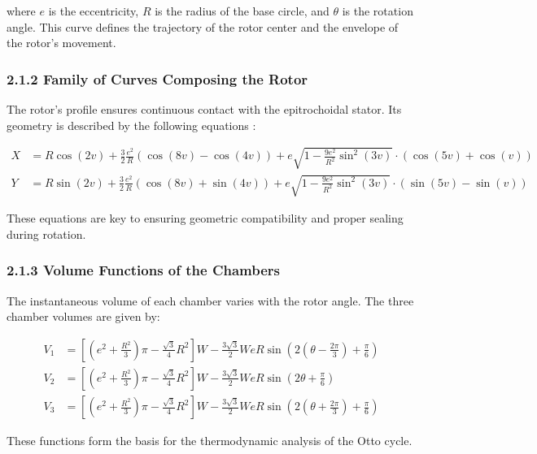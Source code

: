 \documentclass[man,floatsintext,noextraspace]{apa6}
\begin{document}
where \( e \) is the eccentricity, \( R \) is the radius of the base circle, and \( \theta \) is the rotation angle. This curve defines the trajectory of the rotor center and the envelope of the rotor's movement.

\subsubsection{2.1.2 Family of Curves Composing the Rotor}

The rotor’s profile ensures continuous contact with the epitrochoidal stator. Its geometry is described by the following equations \cite{yamamoto1981}:

\begin{align}
X &= R \cos(2v) + \frac{3}{2} \frac{e^2}{R} (\cos(8v) - \cos(4v)) 
+ e \sqrt{1 - \frac{9e^2}{R^2} \sin^2(3v)} \cdot (\cos(5v) + \cos(v)) \\
Y &= R \sin(2v) + \frac{3}{2} \frac{e^2}{R} (\cos(8v) + \sin(4v)) 
+ e \sqrt{1 - \frac{9e^2}{R^2} \sin^2(3v)} \cdot (\sin(5v) - \sin(v))
\end{align}

These equations are key to ensuring geometric compatibility and proper sealing during rotation.

\subsubsection{2.1.3 Volume Functions of the Chambers}

The instantaneous volume of each chamber varies with the rotor angle. The three chamber volumes are given by:

\begin{align}
V_1 &= \left[ \left(e^2 + \frac{R^2}{3}\right)\pi - \frac{\sqrt{3}}{4} R^2 \right] W 
      - \frac{3\sqrt{3}}{2} WeR \sin\left(2\left(\theta - \frac{2\pi}{3}\right) + \frac{\pi}{6}\right) \\
V_2 &= \left[ \left(e^2 + \frac{R^2}{3}\right)\pi - \frac{\sqrt{3}}{4} R^2 \right] W 
      - \frac{3\sqrt{3}}{2} WeR \sin\left(2\theta + \frac{\pi}{6}\right) \\
V_3 &= \left[ \left(e^2 + \frac{R^2}{3}\right)\pi - \frac{\sqrt{3}}{4} R^2 \right] W 
      - \frac{3\sqrt{3}}{2} WeR \sin\left(2\left(\theta + \frac{2\pi}{3}\right) + \frac{\pi}{6}\right)
\end{align}

These functions form the basis for the thermodynamic analysis of the Otto cycle.
\end{document}
